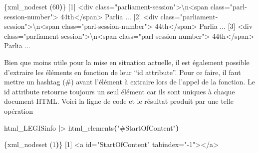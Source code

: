 \documentclass[
  letterpaper,
  DIV=11,
  numbers=noendperiod]{scrreprt}
\newenvironment{Shaded}{\begin{snugshade}}{\end{snugshade}}
\newcommand{\DataTypeTok}[1]{\textcolor[rgb]{0.68,0.00,0.00}{#1}}
\newcommand{\ErrorTok}[1]{\textcolor[rgb]{0.68,0.00,0.00}{#1}}
\newcommand{\ExtensionTok}[1]{\textcolor[rgb]{0.00,0.23,0.31}{#1}}
\newcommand{\KeywordTok}[1]{\textcolor[rgb]{0.00,0.23,0.31}{\textbf{#1}}}
\newcommand{\NormalTok}[1]{\textcolor[rgb]{0.00,0.23,0.31}{#1}}
\newcommand{\OperatorTok}[1]{\textcolor[rgb]{0.37,0.37,0.37}{#1}}
\newcommand{\StringTok}[1]{\textcolor[rgb]{0.13,0.47,0.30}{#1}}
\begin{document}
\begin{Shaded}
\begin{Highlighting}[]
\ExtensionTok{\{xml\_nodeset} \ErrorTok{(}\ExtensionTok{60}\KeywordTok{)}\ErrorTok{\}}
 \ExtensionTok{[1]} \OperatorTok{\textless{}}\NormalTok{div class=}\StringTok{"parliament{-}session"}\OperatorTok{\textgreater{}}\DataTypeTok{\textbackslash{}n}\OperatorTok{\textless{}}\NormalTok{span class=}\StringTok{"parl{-}session{-}number"}\OperatorTok{\textgreater{}}
 \ExtensionTok{44th}\OperatorTok{\textless{}}\NormalTok{/span}\OperatorTok{\textgreater{}}\NormalTok{ Parlia ...}
 \ExtensionTok{[2]} \OperatorTok{\textless{}}\NormalTok{div class=}\StringTok{"parliament{-}session"}\OperatorTok{\textgreater{}}\DataTypeTok{\textbackslash{}n}\OperatorTok{\textless{}}\NormalTok{span class=}\StringTok{"parl{-}session{-}number"}\OperatorTok{\textgreater{}}
 \ExtensionTok{44th}\OperatorTok{\textless{}}\NormalTok{/span}\OperatorTok{\textgreater{}}\NormalTok{ Parlia ...}
 \ExtensionTok{[3]} \OperatorTok{\textless{}}\NormalTok{div class=}\StringTok{"parliament{-}session"}\OperatorTok{\textgreater{}}\DataTypeTok{\textbackslash{}n}\OperatorTok{\textless{}}\NormalTok{span class=}\StringTok{"parl{-}session{-}number"}\OperatorTok{\textgreater{}}
 \ExtensionTok{44th}\OperatorTok{\textless{}}\NormalTok{/span}\OperatorTok{\textgreater{}}\NormalTok{ Parlia ...}
\end{Highlighting}
\end{Shaded}

Bien que moins utile pour la mise en situation actuelle, il est
également possible d'extraire les éléments en fonction de leur ``id
attribute''. Pour ce faire, il faut mettre un hashtag (\#) avant
l'élément à extraire lors de l'appel de la fonction. Le id attribute
retourne toujours un seul élément car ils sont uniques à chaque document
HTML. Voici la ligne de code et le résultat produit par une telle
opération

\begin{Shaded}
\begin{Highlighting}[]
\ExtensionTok{html\_LEGISinfo} \KeywordTok{|}\OperatorTok{\textgreater{}}\NormalTok{ html\_elements}\KeywordTok{(}\StringTok{"\#StartOfContent"}\KeywordTok{)}
\end{Highlighting}
\end{Shaded}

\begin{Shaded}
\begin{Highlighting}[]
\ExtensionTok{\{xml\_nodeset} \ErrorTok{(}\ExtensionTok{1}\KeywordTok{)}\ErrorTok{\}}
\ExtensionTok{[1]} \OperatorTok{\textless{}}\NormalTok{a id=}\StringTok{"StartOfContent"}\NormalTok{ tabindex=}\StringTok{"{-}1"}\OperatorTok{\textgreater{}\textless{}}\NormalTok{/a}\OperatorTok{\textgreater{}}
\end{Highlighting}
\end{Shaded}
\end{document}
